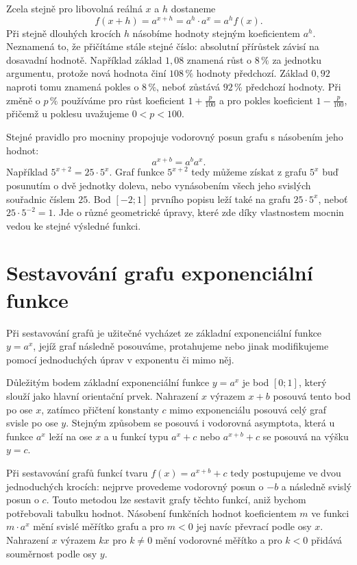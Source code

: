 \documentclass[12pt,a4paper]{article}
\begin{document}
Zcela stejně pro libovolná reálná $x$ a $h$ dostaneme
\[
    f(x+h)=a^{x+h}=a^h\cdot a^x=a^h f(x).
\]
Při stejně dlouhých krocích $h$ násobíme hodnoty stejným koeficientem $a^h$.
Neznamená to, že přičítáme stále stejné číslo: absolutní přírůstek závisí na dosavadní hodnotě.
Například základ $1{,}08$ znamená růst o $8\,\%$ za jednotku argumentu,
protože nová hodnota činí $108\,\%$ hodnoty předchozí.
Základ $0{,}92$ naproti tomu znamená pokles o $8\,\%$, neboť zůstává $92\,\%$ předchozí hodnoty.
Při změně o $p\,\%$ používáme pro růst koeficient $1+\frac{p}{100}$
a pro pokles koeficient $1-\frac{p}{100}$, přičemž u poklesu uvažujeme $0<p<100$.

Stejné pravidlo pro mocniny propojuje vodorovný posun grafu s násobením jeho hodnot:
\[
    a^{x+b}=a^b a^x.
\]
Například $5^{x+2}=25\cdot5^x$.
Graf funkce $5^{x+2}$ tedy můžeme získat z grafu $5^x$ buď posunutím o dvě jednotky doleva,
nebo vynásobením všech jeho svislých souřadnic číslem $25$.
Bod $[-2;1]$ prvního popisu leží také na grafu $25\cdot5^x$, neboť $25\cdot5^{-2}=1$.
Jde o různé geometrické úpravy, které zde díky vlastnostem mocnin vedou ke stejné výsledné funkci.

\section*{Sestavování grafu exponenciální funkce}

Při sestavování grafů je užitečné vycházet ze základní exponenciální funkce $y=a^{x}$,
jejíž graf následně posouváme, protahujeme nebo jinak modifikujeme pomocí jednoduchých úprav
v exponentu či mimo něj.

Důležitým bodem základní exponenciální funkce $y=a^x$ je bod \textbf{$[0;1]$}, který slouží jako hlavní orientační prvek.
Nahrazení $x$ výrazem $x+b$ posouvá tento bod po ose $x$,
zatímco přičtení konstanty $c$ mimo exponenciálu posouvá celý graf svisle po ose $y$.
Stejným způsobem se posouvá i vodorovná asymptota, která u funkce $a^{x}$ leží na ose $x$
a u funkcí typu $a^{x}+c$ nebo $a^{x+b}+c$ se posouvá na výšku $y=c$.

Při sestavování grafů funkcí tvaru $f(x)=a^{x+b}+c$ tedy postupujeme ve dvou jednoduchých krocích:
nejprve provedeme vodorovný posun o $-b$ a následně svislý posun o $c$.
Touto metodou lze sestavit grafy těchto funkcí, aniž bychom potřebovali tabulku hodnot.
Násobení funkčních hodnot koeficientem $m$ ve funkci $m\cdot a^x$ mění svislé měřítko grafu a pro $m<0$ jej navíc převrací podle osy $x$.
Nahrazení $x$ výrazem $kx$ pro $k\neq0$ mění vodorovné měřítko a pro $k<0$ přidává souměrnost podle osy $y$.
\end{document}
